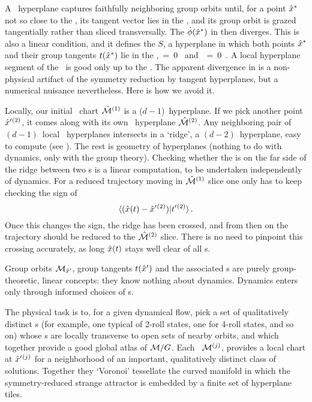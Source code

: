 A \slice\ hyperplane captures faithfully neighboring group orbits until,
for a point $\hat{x}^\ast$ not so close to the \template, its tangent vector
lies in the \slice,
and its group orbit is grazed tangentially rather than sliced
transversally. The {\phaseVel} $\dot{{\bf \phi}}(\hat{x}^\ast)$ in
 then diverges. This is also a linear condition, and it
defines the {\sliceBord} $S$, a hyperplane in which both points
$\hat{x}^\ast$ and their group tangents $t(\hat{x}^\ast)$ lie in the
{\slice},
\beq
\braket{\sspRSing}{\sliceTan{}} \,=\, 0
      \mbox{ and }
\braket{\groupTan(\sspRSing)}{\sliceTan{}} \,=\, 0
\,.
\label{sliceSingl0}
\eeq
A local hyperplane segment of the \slice\ is good only up to the
\sliceBord. The apparent divergence in {\phaseVel}  is
a non-physical artifact of the symmetry reduction by tangent hyperplanes,
but a numerical nuisance nevertheless. Here is how we avoid it.

Locally, our initial \slice\ chart $\hat{\cal M}{}^{(1)}$ is a ($d\!-\!1$)\dmn\
hyperplane. If we pick another {\template} point ${\hat{x}'}{}^{(2)}$, it
comes along with its own \slice\ hyperplane $\hat{\cal M}{}^{(2)}$. Any
neighboring pair of $(d\!-\!1)$\dmn\ local \slice\ hyperplanes intersects
in a `ridge', a $(d\!-\!2)$\dmn\ hyperplane, easy to compute (see
\reffig{fig:A29-2slices}). The rest is geometry of hyperplanes (nothing
to do with dynamics, only with the group theory). Checking whether the
{\chartBord} is on the far side of the ridge between two \slice
s is a linear computation, to be undertaken independently of dynamics.
For a reduced trajectory moving in $\hat{\cal M}{}^{(1)}$ slice one only has to
keep checking the sign of
\[
\braket{(\sspRed(\zeit)- \slicep{}^{(2)})}{\sliceTan{}{}^{(2)}}
\,.
\]
Once this changes the sign, the ridge has been crossed, and from then on the
trajectory should be reduced to the $\hat{\cal M}{}^{(2)}$ slice. There is no need to
pinpoint this crossing accurately, as long $\hat{x}(t)$ stays well clear of
all \chartBord s.

Group orbits ${\cal M}_{{\hat{x}'}}$, group tangents $t({\hat{x}'})$ and the
associated \slice s are purely group-theoretic, linear concepts: they
know nothing about dynamics. Dynamics enters only through informed
choices of \template s.

The physical task is to, for a given dynamical flow, pick a set of
qualitatively distinct {\template s} (for example, one typical of 2-roll
states, one for 4-roll states, and so on) whose \slice s  are locally
transverse to open sets of nearby orbits, and which together provide a
good global atlas of ${\cal M}/G$. Each \slice\ ${\cal M}{}^{(j)}$, provides a
local chart at ${\hat{x}'}{}^{(j)}$ for a neighborhood of an important,
qualitatively distinct class of solutions. Together they `Voronoi'
tessellate  the curved manifold in which the symmetry-reduced strange
attractor is embedded by a finite set of hyperplane tiles.

